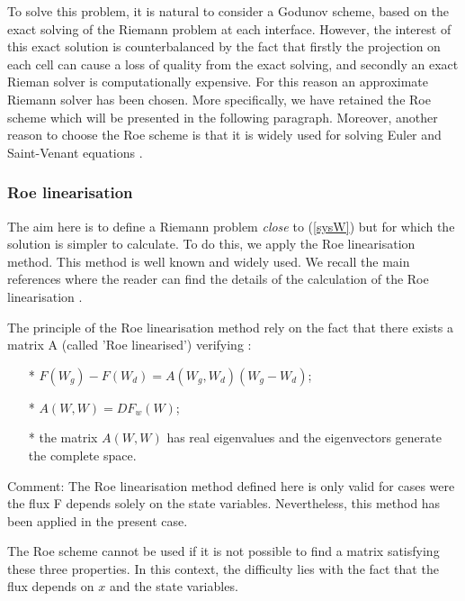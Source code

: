 To solve this problem, it is natural to consider a Godunov scheme, based on the exact solving of the Riemann problem at each interface. However, the interest of this exact solution is counterbalanced by the fact that firstly the projection on each cell can cause a loss of quality from the exact solving, and secondly an exact Rieman solver is computationally expensive. For this reason an approximate Riemann solver has been chosen. More specifically, we have retained the Roe scheme which will be presented in the following paragraph. Moreover, another reason to choose the Roe scheme is that it is widely used for solving Euler and Saint-Venant equations \cite{PAQUIER95}\cite{VAZQUEZ94}\cite{AMBROSI95}\cite{MONTHE97}.

\subsubsection{Roe linearisation}
\label{LinRoe}

The aim here is to define a Riemann problem \textit{close} to (\ref{sysW}) but for which the solution is simpler to calculate. To do this, we apply the Roe linearisation method. This method is well known and widely used. We recall the main references where the reader can find the details of the calculation of the Roe linearisation \cite{ROE81}\cite{BUFFARD93}.

The principle of the Roe linearisation method rely on the fact that there exists a matrix A (called 'Roe linearised') verifying :
\begin{itemize}
 \item[*] $F(W_g) - F(W_d) = A(W_g,W_d)(W_g-W_d)$;
 \item[*] $A(W,W) = DF_{w}(W)$;
 \item[*] the matrix $A(W,W)$ has real eigenvalues and the eigenvectors generate the complete space.
\end{itemize}

\begin{CommentBlock}{Comment: }
The Roe linearisation method defined here is only valid for cases were the flux F depends solely on the state variables. Nevertheless, this method has been applied in the present case.
\end{CommentBlock}

The Roe scheme cannot be used if it is not possible to find a matrix satisfying these three properties. In this context, the difficulty lies with the fact that the flux depends on $x$ and the state variables.

